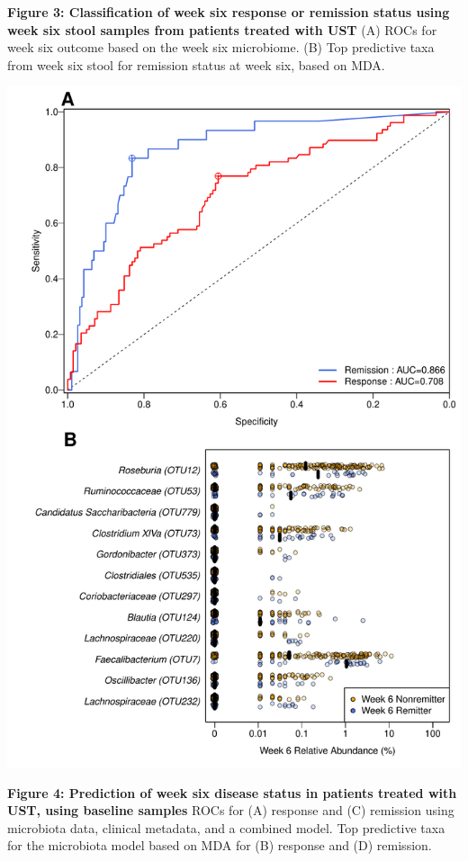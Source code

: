 \documentclass[11pt,]{article}
\begin{document}
\newpage

\textbf{Figure 3: Classification of week six response or remission
status using week six stool samples from patients treated with UST} (A)
ROCs for week six outcome based on the week six microbiome. (B) Top
predictive taxa from week six stool for remission status at week six,
based on MDA.

\includegraphics{figures/Figure3_wk6Xwk6.pdf}

\newpage

\textbf{Figure 4: Prediction of week six disease status in patients
treated with UST, using baseline samples} ROCs for (A) response and (C)
remission using microbiota data, clinical metadata, and a combined
model. Top predictive taxa for the microbiota model based on MDA for (B)
response and (D) remission.
\end{document}
